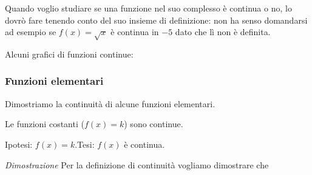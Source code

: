Quando voglio studiare se una funzione nel suo complesso è continua o no, lo 
dovrò fare tenendo conto del suo insieme di definizione: non ha senso 
domandarsi ad esempio se \(f(x) = \sqrt{x}\) è continua in \(-5\) dato che lì 
non è definita.

Alcuni grafici di funzioni continue:

\hspace{-12mm}\begin{minipage}{.32\textwidth}
\begin{center} \scalebox{.9}{\contsecondo} \end{center}
\end{minipage}
\hfill
\begin{minipage}{.32\textwidth}
\begin{center} \contrad \end{center}
\end{minipage}
\hfill
\begin{minipage}{.32\textwidth}
\begin{center} \contip \end{center}
\end{minipage}


\subsubsection{Funzioni elementari}
\label{subsubsec:cont_funzionielementari}

Dimostriamo la continuità di alcune funzioni elementari.

\begin{teorema}
Le funzioni costanti (\(f(x) = k\)) sono continue.
\end{teorema}

Ipotesi: \(f(x)=k\).\tab Tesi: \(f(x)\) è continua.


\noindent \emph{Dimostrazione}
Per la definizione di continuità vogliamo dimostrare che 


